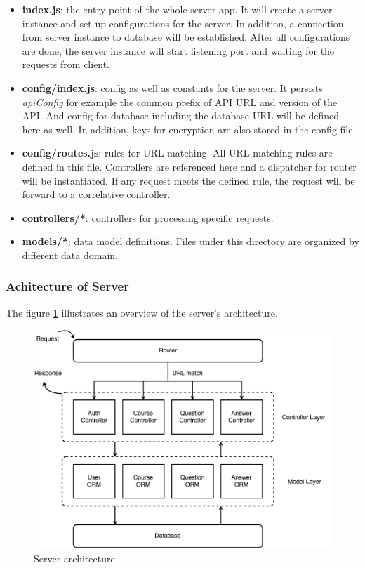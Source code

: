 \begin{itemize}
\item 
  \textbf{index.js}: the entry point of the whole server app. It will create a server instance and set up configurations for the server. In addition, a connection from server instance to database will be established. After all configurations are done, the server instance will start listening port and waiting for the requests from client.
\item
  \textbf{config/index.js}: config as well as constants for the server. It persists \textit{apiConfig} for example the common prefix of API URL and version of the API. And config for database including the database URL will be defined here as well. In addition, keys for encryption are also stored in the config file.
\item
  \textbf{config/routes.js}: rules for URL matching. All URL matching rules are defined in this file. Controllers are referenced here and a dispatcher for router will be instantiated. If any request meets the defined rule, the request will be forward to a correlative controller. 
\item
  \textbf{controllers/*}: controllers for processing specific requests.
\item 
  \textbf{models/*}: data model definitions. Files under this directory are organized by different data domain.
\end{itemize}


\subsubsection{Achitecture of Server}

The figure \ref{fig:server-arch-imp} illustrates an overview of the server's architecture. 

\begin{figure}[!htbp]
  \centering
    \includegraphics[width=1\textwidth]{Figures/imp-server-arch.pdf}
  \caption{Server architecture}
  \label{fig:server-arch-imp}
\end{figure}




